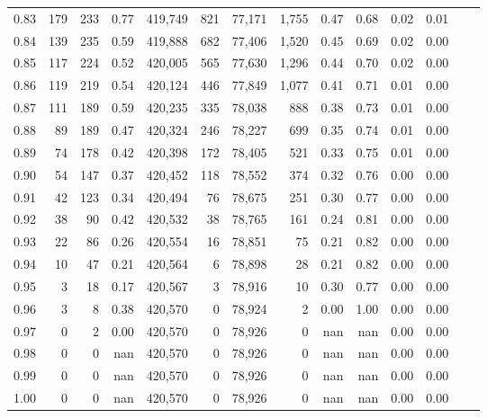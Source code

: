 \begin{tabular}{rrrrrrrrrrrrrr}
0.83 &     179 &    233 &    0.77 &  419,749 &      821 &  77,171 &   1,755 &  0.47 &  0.68 &  0.02 &      0.01 \\
0.84 &     139 &    235 &    0.59 &  419,888 &      682 &  77,406 &   1,520 &  0.45 &  0.69 &  0.02 &      0.00 \\
0.85 &     117 &    224 &    0.52 &  420,005 &      565 &  77,630 &   1,296 &  0.44 &  0.70 &  0.02 &      0.00 \\
0.86 &     119 &    219 &    0.54 &  420,124 &      446 &  77,849 &   1,077 &  0.41 &  0.71 &  0.01 &      0.00 \\
0.87 &     111 &    189 &    0.59 &  420,235 &      335 &  78,038 &     888 &  0.38 &  0.73 &  0.01 &      0.00 \\
0.88 &      89 &    189 &    0.47 &  420,324 &      246 &  78,227 &     699 &  0.35 &  0.74 &  0.01 &      0.00 \\
0.89 &      74 &    178 &    0.42 &  420,398 &      172 &  78,405 &     521 &  0.33 &  0.75 &  0.01 &      0.00 \\
0.90 &      54 &    147 &    0.37 &  420,452 &      118 &  78,552 &     374 &  0.32 &  0.76 &  0.00 &      0.00 \\
0.91 &      42 &    123 &    0.34 &  420,494 &       76 &  78,675 &     251 &  0.30 &  0.77 &  0.00 &      0.00 \\
0.92 &      38 &     90 &    0.42 &  420,532 &       38 &  78,765 &     161 &  0.24 &  0.81 &  0.00 &      0.00 \\
0.93 &      22 &     86 &    0.26 &  420,554 &       16 &  78,851 &      75 &  0.21 &  0.82 &  0.00 &      0.00 \\
0.94 &      10 &     47 &    0.21 &  420,564 &        6 &  78,898 &      28 &  0.21 &  0.82 &  0.00 &      0.00 \\
0.95 &       3 &     18 &    0.17 &  420,567 &        3 &  78,916 &      10 &  0.30 &  0.77 &  0.00 &      0.00 \\
0.96 &       3 &      8 &    0.38 &  420,570 &        0 &  78,924 &       2 &  0.00 &  1.00 &  0.00 &      0.00 \\
0.97 &       0 &      2 &    0.00 &  420,570 &        0 &  78,926 &       0 &   nan &   nan &  0.00 &      0.00 \\
0.98 &       0 &      0 &     nan &  420,570 &        0 &  78,926 &       0 &   nan &   nan &  0.00 &      0.00 \\
0.99 &       0 &      0 &     nan &  420,570 &        0 &  78,926 &       0 &   nan &   nan &  0.00 &      0.00 \\
1.00 &       0 &      0 &     nan &  420,570 &        0 &  78,926 &       0 &   nan &   nan &  0.00 &      0.00 \\
\bottomrule
\end{tabular}

